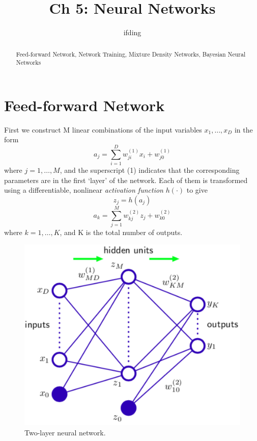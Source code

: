 \documentclass[5p,sort&compress]{elsarticle}
\begin{document}
\begin{frontmatter}
    \title{Ch 5: Neural Networks}
    \author{ifding}
    
    \begin{abstract}
        Feed-forward Network, Network Training, Mixture Density Networks, Bayesian Neural Networks
    \end{abstract}


\end{frontmatter}


\section{Feed-forward Network}

First we construct M linear combinations of the input variables $x_1, \ldots, x_D$ in the form
\begin{equation}
a_{j}=\sum_{i=1}^{D} w_{j i}^{(1)} x_{i}+w_{j 0}^{(1)}
\end{equation}
where $j=1,\ldots, M$, and the superscript (1) indicates that the corresponding parameters are in the first `layer' of the network. Each of them is transformed using a differentiable, nonlinear \textit{activation function} $h(\cdot)$ to give
\begin{equation}
z_j = h(a_j)
\end{equation}
\begin{equation}
a_{k}=\sum_{j=1}^{M} w_{k j}^{(2)} z_{j}+w_{k 0}^{(2)}
\end{equation}
where $k=1, \ldots, K$, and K is the total number of outputs.

\begin{figure}[ht]
     \centering
     \includegraphics[width = \linewidth]{figure/figure5_1.png}
     \caption{Two-layer neural network.}
     \label{fig:nn}
\end{figure}
\end{document}
